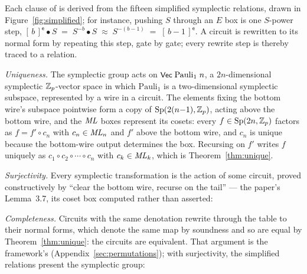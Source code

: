 

\noindent Each clause of  is derived from the fifteen
simplified symplectic relations, drawn in
Figure~\ref{fig:simplified}; for instance, pushing $S$ through an $E$
box is one $S$-power step, $[\,b\,]^{\mathsf e} \bullet S \;=\;
S^{-b} \bullet S \;\approx\; S^{-(b-1)} \;=\; [\,b-1\,]^{\mathsf
e}$.  A circuit is
rewritten to its normal form by repeating this step, gate by gate;
every rewrite step is thereby traced to a relation.

\emph{Uniqueness.}  The symplectic group acts on
$\mbox{\textsf{\small Vec}}\;\mathrm{Pauli}_1\;n$, a $2n$-dimensional symplectic
$\mathbb{Z}_p$-vector space in which $\mathrm{Pauli}_1$ is a two-dimensional
symplectic subspace, represented by a wire in a circuit.  The elements
fixing the bottom wire's subspace pointwise form a copy of
$\mathrm{Sp}(2(n{-}1), \mathbb{Z}_p)$, acting above the bottom wire, and the
$\mathit{ML}$ boxes represent its cosets: every $f \in \mathrm{Sp}(2n,\mathbb{Z}_p)$ factors as $f = f'
\circ c_n$ with $c_n \in \mathit{ML}_n$ and $f'$ above the bottom wire, and
$c_n$ is unique because the bottom-wire output determines the box.
Recursing on $f'$ writes $f$ uniquely as $c_1 \circ c_2 \circ \cdots
\circ c_n$ with $c_k \in \mathit{ML}_k$, which is Theorem~\ref{thm:unique}.

\medskip\noindent
\emph{Surjectivity.}  Every symplectic transformation is the action of
some circuit, proved constructively by ``clear the bottom wire,
recurse on the tail'' --- the paper's Lemma~3.7, its coset box
computed rather than asserted:



\medskip\noindent
\emph{Completeness.}  Circuits with the same denotation rewrite
through the table to their normal forms, which denote the same map by
soundness and so are equal by Theorem~\ref{thm:unique}: the circuits
are equivalent.  That argument is the framework's
 (Appendix~\ref{sec:permutations}); with
surjectivity, the simplified relations present the symplectic group:


